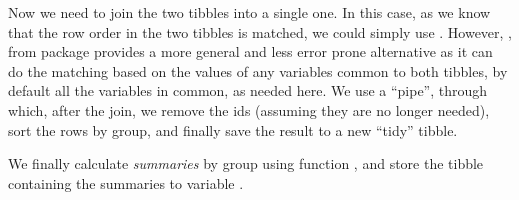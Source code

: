 \documentclass[krantz2,ChapterTOCs]{krantz}\usepackage{knitr}
\begin{document}
Now we need to join the two tibbles into a single one. In this case, as we know that the row order in the two tibbles is matched, we could simply use . However, , from package  provides a more general and less error prone alternative as it can do the matching based on the values of any variables common to both tibbles, by default all the variables in common, as needed here. We use a ``pipe'', through which, after the join, we remove the ids (assuming they are no longer needed), sort the rows by group, and finally save the result to a new ``tidy'' tibble.

\begin{knitrout}\footnotesize
{}\color{fgcolor}
\end{knitrout}

We finally calculate \emph{summaries} by group using function , and store the tibble containing the summaries to variable .
\end{document}

